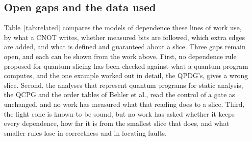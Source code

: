\subsection{Open gaps and the data used}
Table~\ref{tab:related} compares the models of dependence these lines of work use, by what a CNOT writes, whether
measured bits are followed, which extra edges are added, and what is defined and guaranteed about a slice. Three gaps
remain open, and each can be shown from the work above. First, no dependence rule proposed for quantum slicing has
been checked against what a quantum program computes, and the one example worked out in detail, the QPDG's, gives a
wrong slice. Second, the analyses that represent quantum programs for static analysis, the QCPG and the order tables
of Behler et al., read the control of a gate as unchanged, and no work has measured what that reading does to a slice.
Third, the light cone is known to be sound, but no work has asked whether it keeps every dependence, how far it is from
the smallest slice that does, and what smaller rules lose in correctness and in locating faults.


